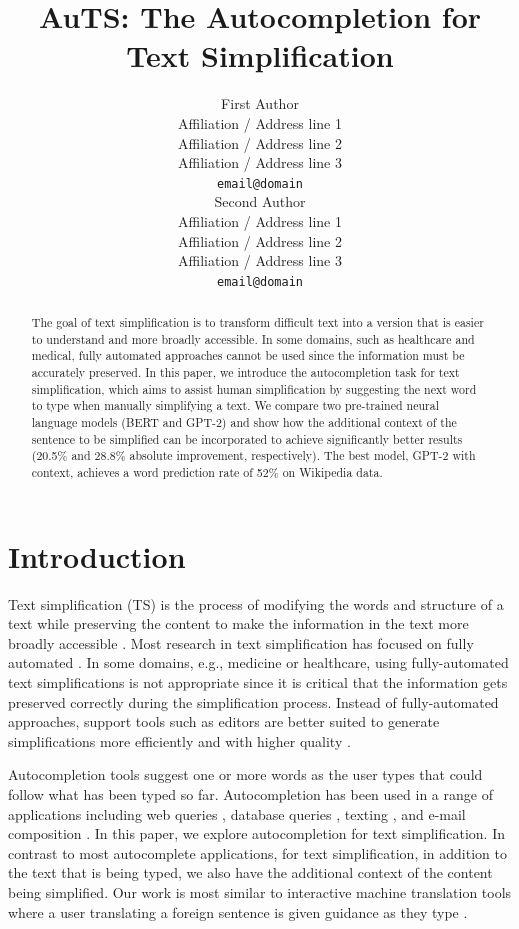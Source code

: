 \documentclass[11pt,a4paper]{article}
\title{AuTS: The Autocompletion for Text Simplification}
\author{First Author \\
  Affiliation / Address line 1 \\
  Affiliation / Address line 2 \\
  Affiliation / Address line 3 \\
  \texttt{email@domain} \\\And
  Second Author \\
  Affiliation / Address line 1 \\
  Affiliation / Address line 2 \\
  Affiliation / Address line 3 \\
  \texttt{email@domain} \\}
\date{}
\begin{document}
\maketitle
\begin{abstract}
The goal of text simplification is to transform difficult text into a version that is easier to understand and more broadly accessible.  In some domains, such as healthcare and medical, fully automated approaches cannot be used since the information must be accurately preserved.  In this paper, we introduce the autocompletion task for text simplification, which aims to assist human simplification by suggesting the next word to type when manually simplifying a text.  We compare two pre-trained neural language models (BERT and GPT-2) and show how the additional context of the sentence to be simplified can be incorporated to achieve significantly better results (20.5\% and 28.8\% absolute improvement, respectively).  The best model, GPT-2 with context, achieves a word prediction rate of 52\% on Wikipedia data.

\end{abstract}

\section{Introduction}

Text simplification (TS) is the process of modifying the words and structure of a text while preserving the content to make the information in the text more broadly accessible \cite{shardlow2014survey}.  Most research in text simplification has focused on fully automated \cite{zhu10,coster2011learning,xu2016optimizing, zhang2017sentence,nishihara2019controllable}.  In some domains, e.g., medicine or healthcare, using fully-automated text simplifications is not appropriate since it is critical that the information gets preserved correctly during the simplification process. Instead of fully-automated approaches, support tools such as editors are better suited to generate simplifications more efficiently and with higher quality \cite{kloehn2018jmir}.

Autocompletion tools suggest one or more words as the user types that could follow what has been typed so far.  Autocompletion has been used in a range of applications including web queries \cite{cai2016survey}, database queries \cite{khoussainova2010snipsuggest}, texting \cite{dunlop2000predictive}, and e-mail composition \cite{dai2019gmail}. In this paper, we explore autocompletion for text simplification.  In contrast to most autocomplete applications, for text simplification, in addition to the text that is being typed, we also have the additional context of the content being simplified.  Our work is most similar to interactive machine translation tools where a user translating a foreign sentence is given guidance as they type \cite{green-etal-2014-human}.
\end{document}
